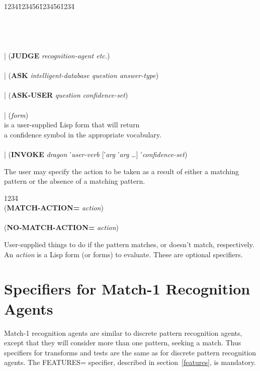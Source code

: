 \begin{tabbing}
1234\=123456\=123456\=1234\= \kill
\\
 \\
\\
\> \\
\\
\>\>| ({\bf JUDGE} {\it recognition-agent etc.\/}) \\
\\
\>\>| ({\bf ASK} {\it intelligent-database question answer-type\/}) \\
\\
\>\>| ({\bf ASK-USER} {\it question confidence-set\/}) \\
\\
\>\>| ({\it form\/}) \\
\>\> is a user-supplied Lisp form that will return \\
\>\>\>\>a confidence symbol in the appropriate vocabulary. \\
\\
\>\>| ({\bf INVOKE} {\it dragon} '{\it user-verb\/}
['{\it arg} '{\it arg\/} \ldots]  '{\it confidence-set\/})
\\
\end{tabbing}
The user may specify the action to be taken as a result of either
a matching pattern or the absence of a matching pattern.

\begin{tabbing}
1234\= \kill
\\
({\bf MATCH-ACTION=} {\it action\/}) \\
\\
({\bf NO-MATCH-ACTION=} {\it action\/})
\end{tabbing}
User-supplied things to do if the pattern matches, or doesn't match,
respectively.  An {\it action\/} is a Lisp form (or forms) to
evaluate.  These are optional specifiers.





\section{Specifiers for Match-1 Recognition Agents}

Match-1 recognition agents are similar to discrete pattern recognition
agents, except that they will consider more than one pattern, seeking
a match.  Thus specifiers for transforms and tests are the same as for
discrete pattern recognition agents. The FEATURES= specifier,
described in section~\ref{features}, is mandatory.

